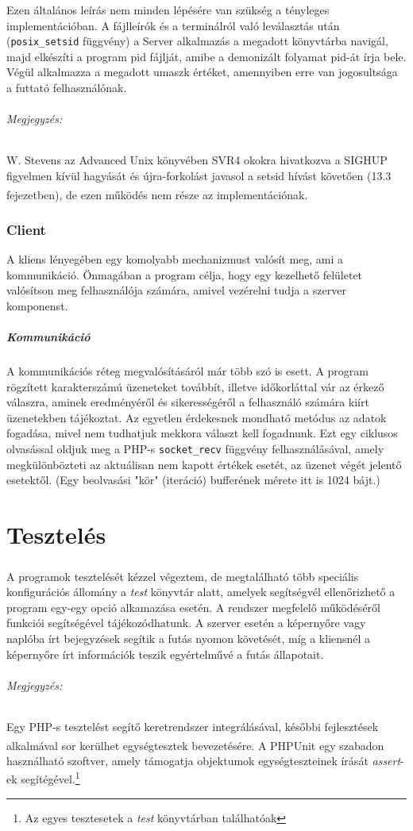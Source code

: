 \documentclass[12pt]{report}
\begin{document}
 Ezen általános leírás nem minden lépésére van szükség a tényleges implementációban. A fájlleírók és a terminálról való leválasztás után (\verb|posix_setsid| függvény) a Server alkalmazás a megadott könyvtárba navigál, majd elkészíti a program pid fájlját, amibe a demonizált folyamat pid-át írja bele. Végül alkalmazza a megadott umaszk értéket, amennyiben erre van jogosultsága a futtató felhasználónak.
 \subparagraph{Megjegyzés:}
 W. Stevens az Advanced Unix könyvében SVR4 okokra hivatkozva a SIGHUP figyelmen kívül hagyását és újra-forkolást javasol a setsid hívást követően (13.3 fejezetben), de ezen működés nem része az implementációnak.\textsuperscript{\cite{stevens}}
\subsection{Client}
A kliens lényegében egy komolyabb mechanizmust valósít meg, ami a kommunikáció. Önmagában a program célja, hogy egy kezelhető felületet valósítson meg felhasználója számára, amivel vezérelni tudja a szerver komponenst.
  \paragraph{Kommunikáció}
  A kommunikációs réteg megvalósításáról már több szó is esett. A program rögzített karakterszámú üzeneteket továbbít, illetve időkorláttal vár az érkező válaszra, aminek eredményéről és sikerességéről a felhasználó számára kiírt üzenetekben tájékoztat.
  Az egyetlen érdekesnek mondható metódus az adatok fogadása, mivel nem tudhatjuk mekkora választ kell fogadnunk. Ezt egy ciklusos olvasással oldjuk meg a PHP-s \verb|socket_recv| függvény felhasználásával, amely megkülönbözteti az aktuálisan nem kapott értékek esetét, az üzenet végét jelentő esetektől. (Egy beolvasási "kör" (iteráció) bufferének mérete itt is 1024 bájt.)

\chapter{Tesztelés}
\paragraph{}
A programok tesztelését kézzel végeztem, de megtalálható több speciális konfigurációs állomány a \textit{test} könyvtár alatt, amelyek segítségvél ellenőrizhető a program egy-egy opció alkamazása esetén. A rendszer megfelelő működéséről funkciói segítségével tájékozódhatunk. A szerver esetén a képernyőre vagy naplóba írt bejegyzések segítik a futás nyomon követését, míg a kliensnél a képernyőre írt információk teszik egyértelművé a futás állapotait. 
\subparagraph{Megjegyzés:}
Egy PHP-s tesztelést segítő keretrendszer integrálásával, későbbi fejlesztések alkalmával sor kerülhet egységtesztek bevezetésére. A PHPUnit\textsuperscript{\cite{phpunit}} egy szabadon használható szoftver, amely támogatja objektumok egységteszteinek írását \textit{assert}-ek segítégével.\footnote{Az egyes tesztesetek a \textit{test} könyvtárban találhatóak}
\end{document}
